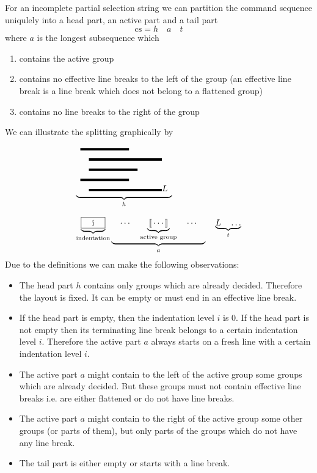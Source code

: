 \documentclass[12pt]{article}
\def\GS{\,[\![\,}
\def\GE{\,]\!]\,}
\begin{document}
For an incomplete partial selection string we can partition the command
sequence uniqulely into a head part, an active part and a tail part
$$
\text{cs} = h \quad a \quad t
$$
where $a$ is the longest subsequence which
\begin{enumerate}
\item contains the active group

\item contains no effective line breaks to the left of the group (an effective
  line break is a line break which does not belong to a flattened group)

\item contains no line breaks to the right of the group
\end{enumerate}
We can illustrate the splitting graphically by
{
  \newcommand{\mline}[1]{\text{\rule{#1mm}{1mm}}}
    $$%
    \begin{array}{l}
      \underbrace{
      \begin{array}{l}
        \mline{20} \\
        \quad\mline{30}\\
        \quad\mline{20}\\
        \mline{20} \\
        \quad\mline{30}L
      \end{array}}_h
      \\
      \\
      \underbrace{\text{\framebox[10mm][c]{i}}}_\text{indentation}
      \underbrace{\quad \cdots \quad
         \underbrace{\GS\cdots\GE}_\text{active group}
      \quad \cdots \quad}_a \quad
      \underbrace{L \quad \ldots}_t

    \end{array}
    $$
}
Due to the definitions we can make the following observations:
\begin{itemize}
\item The head part $h$ contains only groups which are already
  decided. Therefore the layout is fixed. It can be empty or must end in an
  effective line break.

\item If the head part is empty, then the indentation level $i$ is $0$. If the
  head part is not empty then its terminating line break belongs to a certain
  indentation level $i$. Therefore the active part $a$ always starts on a
  fresh line with a certain indentation level $i$.

\item The active part $a$ might contain to the left of the active group some
  groups which are already decided. But these groups must not contain
  effective line breaks i.e. are either flattened or do not have line breaks.

\item The active part $a$ might contain to the right of the active group some
  other groups (or parts of them), but only parts of the groups which do not
  have any line break.

\item The tail part is either empty or starts with a line break.
\end{itemize}
\end{document}
